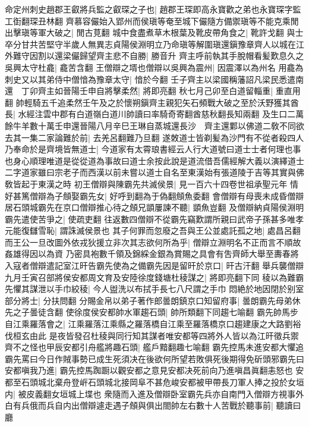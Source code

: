 命定州刺史趙郡王叡將兵監之叡琛之子也|{
	趙郡王琛即高永寶歡之弟也永寶琛字監工衘翻琛丑林翻}
齊慕容儼始入郢州而侯瑱等奄至城下儼隨方備禦瑱等不能克乘閒出擊瑱等軍大破之|{
	閒古莧翻}
城中食盡煮草木根葉及靴皮帶角食之|{
	靴許戈翻}
與士卒分甘共苦堅守半歲人無異志貞陽侯淵明立乃命瑱等解圍瑱還鎭豫章齊人以城在江外難守因割以還梁儼歸望齊主悲不自勝|{
	勝音升}
齊主呼前執其手脫帽看髪歎息久之　吳興太守杜龕|{
	龕苦含翻}
王僧辯之壻也僧辯以吳興為震州|{
	因震澤以為州名}
用龕為刺史又以其弟侍中僧愔為豫章太守|{
	愔於今翻}
壬子齊主以梁國稱藩詔凡梁民悉遣南還　丁卯齊主如晉陽壬申自將擊柔然|{
	將即亮翻}
秋七月己卯至白道留輜重|{
	重直用翻}
帥輕騎五千追柔然壬午及之於懷朔鎭齊主親犯矢石頻戰大破之至於沃野獲其酋長|{
	水經注雲中郡有白道嶺白道川帥讀曰率騎奇寄翻酋慈秋翻長知兩翻}
及生口二萬餘牛羊數十萬壬申還晉陽八月辛巳王琳自蒸城還長沙　齊主還鄴以佛道二敎不同欲去其一集二家論難於前|{
	去羌呂翻難乃旦翻}
遂敇道士皆剃髪為沙門有不從者殺四人乃奉命於是齊境皆無道士|{
	今道家有太霄琅書經云人行大道號曰道士士者何理也事也身心順理唯道是從從道為事故曰道士余按此說是道流借吾儒經解大義以演繹道士二字道家雖曰宗老子而西漢以前未嘗以道士自名至東漢始有張道陵于吉等其實與佛敎皆起于東漢之時}
初王僧辯與陳霸先共滅侯景|{
	見一百六十四卷世祖承聖元年}
情好甚篤僧辯為子頠娶霸先女|{
	好呼到翻為于偽翻頠魚委翻}
會僧辯有母喪未成昏僧辯居石頭城霸先在京口僧辯推心待之頠兄顗屢諫不聽|{
	顗魚豈翻}
及僧辯納貞陽侯淵明霸先遣使苦爭之|{
	使疏吏翻}
往返數四僧辯不從霸先竊歎謂所親曰武帝子孫甚多唯孝元能復讎雪恥|{
	謂誅滅侯景也}
其子何罪而忽廢之吾與王公並處託孤之地|{
	處昌呂翻}
而王公一旦改圖外依戎狄援立非次其志欲何所為乎|{
	僧辯立淵明名不正而言不順故姦雄得因以為資}
乃密具袍數千領及錦綵金銀為賞賜之具會有吿齊師大舉至夀春將入寇者僧辯遣記室江旰告霸先使為之備霸先因是留旰於京口|{
	旰古汗翻}
舉兵襲僧辯九月壬寅召部將侯安都周文育及安陸徐度錢塘杜稜謀之|{
	將即亮翻下同}
稜以為難霸先懼其謀泄以手巾絞稜|{
	今人盥洗以布拭手長七八尺謂之手巾}
悶絶於地因閉於别室部分將士|{
	分扶問翻}
分賜金帛以弟子著作郎曇朗鎮京口知留府事|{
	曇朗霸先母弟休先之子曇徒含翻}
使徐度侯安都帥水軍趨石頭|{
	帥所類翻下同趨七喻翻}
霸先帥馬步自江乘羅落會之|{
	江乘羅落江乘縣之羅落橋自江乘至羅落橋京口趨建康之大路劉裕伐桓玄由此}
是夜皆發召杜稜與同行知其謀者唯安都等四將外人皆以為江旰徵兵禦齊不之怪也甲辰安都引舟艦將趣石頭|{
	艦戶黯翻趣七喻翻}
霸先控馬未進安都大懼追霸先罵曰今日作賊事勢已成生死須决在後欲何所望若敗俱死後期得免斫頭邪霸先曰安都嗔我乃進|{
	霸先控馬踟蹰以觀安都之意見安都决死前向乃進嗔昌眞翻恚怒也}
安都至石頭城北棄舟登㟁石頭城北接岡阜不甚危峻安都被甲帶長刀軍人捧之投於女垣内|{
	被皮義翻女垣城上堞也}
衆隨而入進及僧辯卧室霸先兵亦自南門入僧辯方視事外白有兵俄而兵自内出僧辯遽走遇子頠與俱出閤帥左右數十人苦戰於聽事前|{
	聽讀曰廳}
